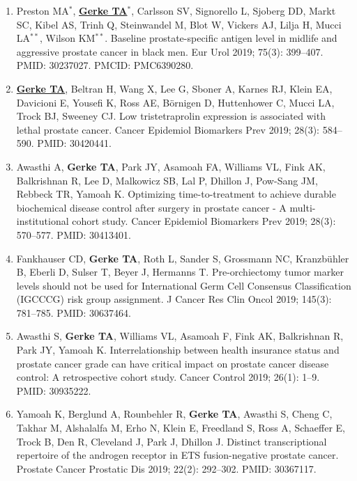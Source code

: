 \documentclass[11pt, a4paper]{article} %
\begin{document}
\begin{enumerate}[leftmargin=*]
\item{} Preston MA$^*$, \underline{{\bf Gerke TA$^*$}}, Carlsson SV, Signorello L, Sjoberg DD, Markt SC, Kibel AS, Trinh Q, Steinwandel M, Blot W, Vickers AJ, Lilja H, Mucci LA$^{**}$, Wilson KM$^{**}$. Baseline prostate-specific antigen level in midlife and aggressive prostate cancer in black men. Eur Urol 2019; 75(3): 399--407. PMID: 30237027. PMCID: PMC6390280.

\item{} \underline{{\bf Gerke TA}}, Beltran H, Wang X, Lee G, Sboner A, Karnes RJ, Klein EA, Davicioni E, Yousefi K, Ross AE, B\"{o}rnigen D, Huttenhower C, Mucci LA, Trock BJ, Sweeney CJ. Low tristetraprolin expression is associated with lethal prostate cancer. Cancer Epidemiol Biomarkers Prev 2019; 28(3): 584--590. PMID: 30420441. 

\item{} Awasthi A, {\bf Gerke TA}, Park JY, Asamoah FA, Williams VL, Fink AK, Balkrishnan R, Lee D, Malkowicz SB, Lal P, Dhillon J, Pow-Sang JM, Rebbeck TR, Yamoah K. Optimizing time-to-treatment to achieve durable biochemical disease control after surgery in prostate cancer - A multi-institutional cohort study. Cancer Epidemiol Biomarkers Prev 2019; 28(3): 570--577. PMID: 30413401. 

\item{} Fankhauser CD, {\bf Gerke TA}, Roth L, Sander S, Grossmann NC, Kranzb{\"u}hler B, Eberli D, Sulser T, Beyer J, Hermanns T. Pre-orchiectomy tumor marker levels should not be used for International Germ Cell Consensus Classification (IGCCCG) risk group assignment. J Cancer Res Clin Oncol 2019; 145(3): 781--785. PMID: 30637464. 

\item{} Awasthi S,  {\bf Gerke TA}, Williams VL, Asamoah F, Fink AK, Balkrishnan R, Park JY, Yamoah K. Interrelationship between health insurance status and prostate cancer grade can have critical impact on prostate cancer disease control: A retrospective cohort study. Cancer Control 2019; 26(1): 1--9. PMID: 30935222. 

\item{} Yamoah K, Berglund A, Rounbehler R, {\bf Gerke TA}, Awasthi S, Cheng C, Takhar M, Alshalalfa M, Erho N, Klein E, Freedland S, Ross A, Schaeffer E, Trock B, Den R, Cleveland J, Park J, Dhillon J. Distinct transcriptional repertoire of the androgen receptor in ETS fusion-negative prostate cancer. Prostate Cancer Prostatic Dis 2019; 22(2): 292--302. PMID: 30367117.


\end{enumerate}
\end{document}
